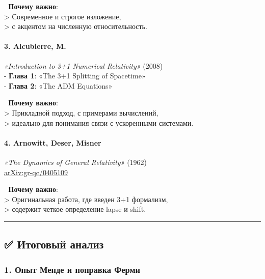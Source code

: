 \documentclass[11pt]{article}
\begin{document}
📌 \textbf{Почему важно}:\\
\textgreater{} Современное и строгое изложение,\\
\textgreater{} с акцентом на численную относительность.

\paragraph{\texorpdfstring{3. \textbf{Alcubierre,
M.}}{3. Alcubierre, M.}}\label{alcubierre-m.}

\emph{«Introduction to 3+1 Numerical Relativity»} (2008)\\
- \textbf{Глава 1}: «The 3+1 Splitting of Spacetime»\\
- \textbf{Глава 2}: «The ADM Equations»

📌 \textbf{Почему важно}:\\
\textgreater{} Прикладной подход, с примерами вычислений,\\
\textgreater{} идеально для понимания связи с ускоренными системами.

\paragraph{\texorpdfstring{4. \textbf{Arnowitt, Deser,
Misner}}{4. Arnowitt, Deser, Misner}}\label{arnowitt-deser-misner}

\emph{«The Dynamics of General Relativity»} (1962)\\
\href{https://arxiv.org/abs/gr-qc/0405109}{arXiv:gr-qc/0405109}

📌 \textbf{Почему важно}:\\
\textgreater{} Оригинальная работа, где введен 3+1 формализм,\\
\textgreater{} содержит четкое определение lapse и shift.

\begin{center}\rule{0.5\linewidth}{\linethickness}\end{center}

\subsection{✅ Итоговый
анализ}\label{ux438ux442ux43eux433ux43eux432ux44bux439-ux430ux43dux430ux43bux438ux437-14}

\subsubsection{1. Опыт Менде и поправка
Ферми}\label{ux43eux43fux44bux442-ux43cux435ux43dux434ux435-ux438-ux43fux43eux43fux440ux430ux432ux43aux430-ux444ux435ux440ux43cux438}
\end{document}
